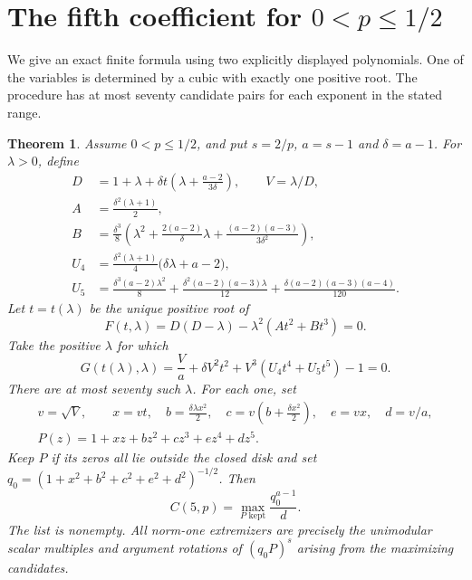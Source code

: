 \documentclass[11pt]{article}
\newtheorem{theorem}{Theorem}
\begin{document}
\section{The fifth coefficient for \texorpdfstring{\(0<p\leq 1/2\)}{0<p<= 1/2}}
\label{sec:fifth-half-range}

We give an exact finite formula using two explicitly displayed
polynomials. One of the variables is determined by a cubic with
exactly one positive root. The procedure has at most seventy
candidate pairs for each exponent in the stated range.

\begin{theorem}\label{thm:fifth-half-range}
Assume \(0<p\leq1/2\), and put \(s=2/p\), \(a=s-1\) and
\(\delta=a-1\). For \(\lambda>0\), define
\begin{align*}
 D&=1+\lambda+\delta t\left(\lambda+\frac{a-2}{3\delta}\right),
 \qquad V=\lambda/D,\\
 A&=\frac{\delta^2(\lambda+1)}2,
\\ B&=\frac{\delta^3}{8}
   \left(\lambda^2+\frac{2(a-2)}{\delta}\lambda
                +\frac{(a-2)(a-3)}{3\delta^2}\right),\\
 U_4&=\frac{\delta^2(\lambda+1)}4\bigl(\delta\lambda+a-2\bigr),\\
 U_5&=\frac{\delta^3(a-2)\lambda^2}{8}
          +\frac{\delta^2(a-2)(a-3)\lambda}{12}
          +\frac{\delta(a-2)(a-3)(a-4)}{120}.
\end{align*}
Let \(t=t(\lambda)\) be the unique positive root of
\begin{equation}\label{eq:fifth-F}
 F(t,\lambda)=D(D-\lambda)-\lambda^2(At^2+Bt^3)=0.
\end{equation}
Take the positive \(\lambda\) for which
\begin{equation}\label{eq:fifth-G}
 G(t(\lambda),\lambda)
   =\frac{V}{a}+\delta V^2t^2+V^3(U_4t^4+U_5t^5)-1=0.
\end{equation}
There are at most seventy such \(\lambda\). For each one, set
\[
 \begin{gathered} v=\sqrt V,\qquad x=vt,\quad b=\frac{\delta\lambda x^2}{2},
 \quad c=v\left(b+\frac{\delta x^2}{2}\right),\quad
 e=vx,\quad d=v/a,\\ 
 P(z)=1+xz+bz^2+cz^3+ez^4+dz^5 .\end{gathered}
\]
Keep \(P\) if its zeros all lie outside the closed disk and set
\(q_0=(1+x^2+b^2+c^2+e^2+d^2)^{-1/2}\). Then
\[
 C(5,p)=\max_{\text{\(P\) kept}}\frac{q_0^{a-1}}{d}.
\]
The list is nonempty. All norm-one extremizers are precisely the
unimodular scalar multiples and argument rotations of
\((q_0P)^s\) arising from the maximizing candidates.
\end{theorem}
\end{document}
